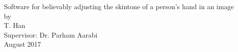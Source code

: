 \documentclass[12pt,a4paper]{report}
\begin{document}
\begin{titlepage}
	\centering
	\vspace{1.5cm}
	\huge Software for believably adjusting the skintone of a person's hand in an image\\
	\vspace{3cm}
	\large by\\
	\vspace{1cm}
	\large T. Han\\
	\vspace{1cm}
	\large Supervisor: Dr. Parham Aarabi\\
	\large August 2017\\
	\vfill
	
\end{titlepage}
\end{document}
